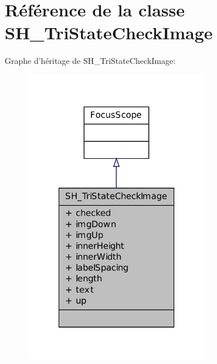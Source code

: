 \hypertarget{classSH__TriStateCheckImage}{\section{Référence de la classe S\-H\-\_\-\-Tri\-State\-Check\-Image}
\label{classSH__TriStateCheckImage}
}


Graphe d'héritage de S\-H\-\_\-\-Tri\-State\-Check\-Image\-:\nopagebreak
\begin{figure}[H]
\begin{center}
\leavevmode
\includegraphics[width=226pt]{classSH__TriStateCheckImage__inherit__graph}
\end{center}
\end{figure}


